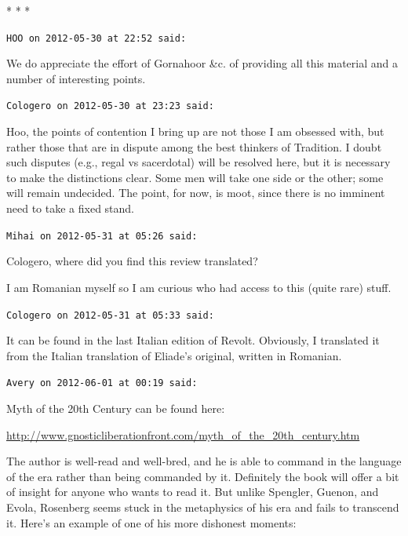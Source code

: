 
\begin{center}* * *\end{center}

\begin{footnotesize}
\begin{sffamily}
\texttt{HOO on 2012-05-30 at 22:52 said:}

We do appreciate the effort of Gornahoor \&c. of providing all this material and a number of interesting points.

\hfill

\texttt{Cologero on 2012-05-30 at 23:23 said:}

Hoo, the points of contention I bring up are not those I am obsessed with, but rather those that are in dispute among the best thinkers of Tradition. I doubt such disputes (e.g., regal vs sacerdotal) will be resolved here, but it is necessary to make the distinctions clear. Some men will take one side or the other; some will remain undecided. The point, for now, is moot, since there is no imminent need to take a fixed stand.

\hfill

\texttt{Mihai on 2012-05-31 at 05:26 said:}

Cologero, where did you find this review translated?

I am Romanian myself so I am curious who had access to this (quite rare) stuff.

\hfill

\texttt{Cologero on 2012-05-31 at 05:33 said:}

It can be found in the last Italian edition of Revolt. Obviously, I translated it from the Italian translation of Eliade's original, written in Romanian.

\hfill

\texttt{Avery on 2012-06-01 at 00:19 said:}

Myth of the 20th Century can be found here:

\url{http://www.gnosticliberationfront.com/myth\_of\_the\_20th\_century.htm}


The author is well-read and well-bred, and he is able to command in the language of the era rather than being commanded by it. Definitely the book will offer a bit of insight for anyone who wants to read it. But unlike Spengler, Guenon, and Evola, Rosenberg seems stuck in the metaphysics of his era and fails to transcend it. Here's an example of one of his more dishonest moments:


\end{sffamily}
\end{footnotesize}
